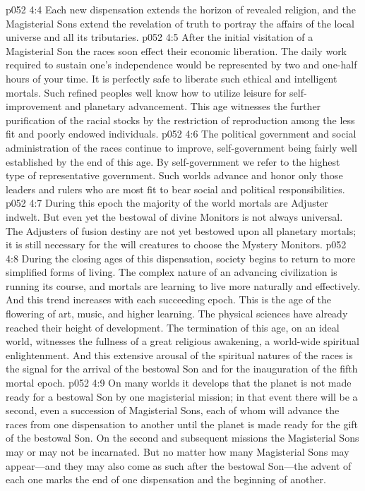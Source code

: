 \vs p052 4:4 Each new dispensation extends the horizon of revealed religion, and the Magisterial Sons extend the revelation of truth to portray the affairs of the local universe and all its tributaries.
\pc \vs p052 4:5 After the initial visitation of a Magisterial Son the races soon effect their economic liberation. The daily work required to sustain one’s independence would be represented by two and one\hyp{}half hours of your time. It is perfectly safe to liberate such ethical and intelligent mortals. Such refined peoples well know how to utilize leisure for self\hyp{}improvement and planetary advancement. This age witnesses the further purification of the racial stocks by the restriction of reproduction among the less fit and poorly endowed individuals.
\vs p052 4:6 The political government and social administration of the races continue to improve, self\hyp{}government being fairly well established by the end of this age. By self\hyp{}government we refer to the highest type of representative government. Such worlds advance and honor only those leaders and rulers who are most fit to bear social and political responsibilities.
\vs p052 4:7 During this epoch the majority of the world mortals are Adjuster indwelt. But even yet the bestowal of divine Monitors is not always universal. The Adjusters of fusion destiny are not yet bestowed upon all planetary mortals; it is still necessary for the will creatures to choose the Mystery Monitors.
\vs p052 4:8 During the closing ages of this dispensation, society begins to return to more simplified forms of living. The complex nature of an advancing civilization is running its course, and mortals are learning to live more naturally and effectively. And this trend increases with each succeeding epoch. This is the age of the flowering of art, music, and higher learning. The physical sciences have already reached their height of development. The termination of this age, on an ideal world, witnesses the fullness of a great religious awakening, a world\hyp{}wide spiritual enlightenment. And this extensive arousal of the spiritual natures of the races is the signal for the arrival of the bestowal Son and for the inauguration of the fifth mortal epoch.
\pc \vs p052 4:9 On many worlds it develops that the planet is not made ready for a bestowal Son by one magisterial mission; in that event there will be a second, even a succession of Magisterial Sons, each of whom will advance the races from one dispensation to another until the planet is made ready for the gift of the bestowal Son. On the second and subsequent missions the Magisterial Sons may or may not be incarnated. But no matter how many Magisterial Sons may appear---and they may also come as such after the bestowal Son---the advent of each one marks the end of one dispensation and the beginning of another.
